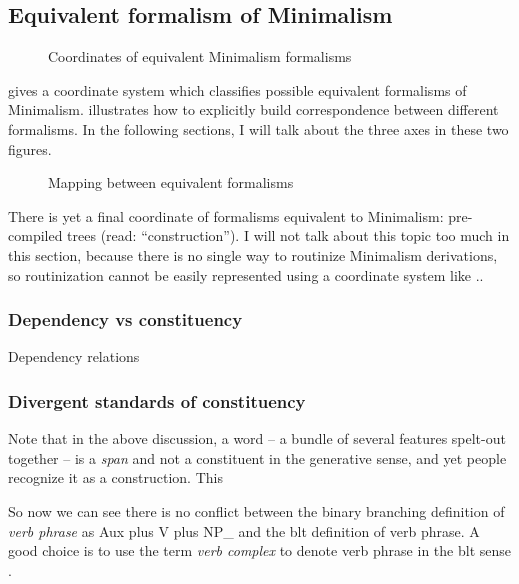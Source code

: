 \documentclass[../main.tex]{subfiles}
\begin{document}
\subsection{Equivalent formalism of Minimalism}

\begin{figure}
    \centering
    
    \caption{Coordinates of equivalent Minimalism formalisms} 
    \label{fig:coordinate-minimalism}
\end{figure}

 gives a coordinate system which classifies possible equivalent formalisms
of Minimalism.  illustrates how to explicitly build correspondence between 
different formalisms. In the following sections, I will talk about the three axes in these two figures. 

\begin{figure}
    \centering
    
    \caption{Mapping between equivalent formalisms}
    \label{fig:minimalism-mapping}
\end{figure}

There is yet a final coordinate of formalisms equivalent to Minimalism: pre-compiled trees 
(read: ``construction''). I will not talk about this topic too much in this section, because there is no 
single way to routinize Minimalism derivations, so routinization cannot be easily represented 
using a coordinate system like .. 

\subsubsection{Dependency vs constituency}\label{sec:minimalist-dependency}

Dependency relations

\subsubsection{Divergent standards of constituency}

Note that in the above discussion, a word -- a bundle of several features spelt-out together -- is a \emph{span}
and not a constituent in the generative sense, and yet people recognize it as a construction. This %

So now we can see there is no conflict between the binary branching definition of \emph{verb phrase} as Aux plus V plus NP_{} and the \ac{blt} definition of verb phrase. A good choice is to use the term 
\emph{verb complex} to denote verb phrase in the \ac{blt} sense \citep{Wilbur2014}.
\end{document}
